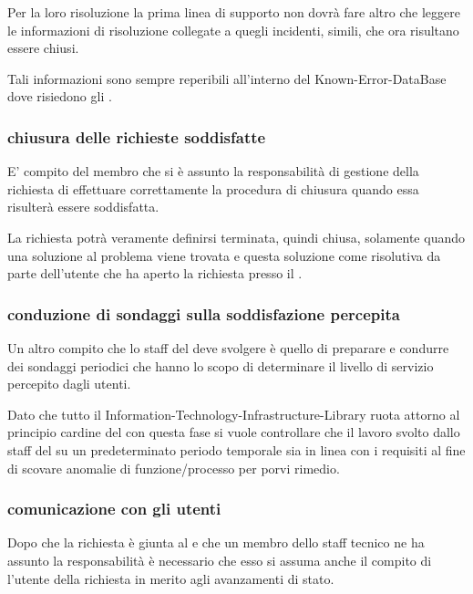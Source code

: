 Per la loro risoluzione la prima linea di supporto non dovrà fare altro che leggere le informazioni di risoluzione collegate a quegli incidenti, simili, che ora risultano essere chiusi.

Tali informazioni sono sempre reperibili all'interno del \ac{Known-Error-DataBase} dove risiedono gli .

\subsubsection[Chiusura delle richieste soddisfatte]{chiusura delle richieste soddisfatte}
E' compito del membro che si è assunto la responsabilità di gestione della richiesta di effettuare correttamente la procedura di chiusura quando essa risulterà essere soddisfatta.

La richiesta potrà veramente definirsi terminata, quindi chiusa, solamente quando una soluzione al problema viene trovata e questa soluzione  come risolutiva da parte dell'utente che ha aperto la richiesta presso il .

\subsubsection[Conduzione di sondaggi sulla soddisfazione percepita]{conduzione di sondaggi sulla soddisfazione percepita}
Un altro compito che lo staff del  deve svolgere è quello di preparare e condurre dei sondaggi periodici che hanno lo scopo di determinare il livello di servizio percepito dagli utenti.

Dato che tutto il  \ac{Information-Technology-Infrastructure-Library} ruota attorno al principio cardine del  con questa fase si vuole controllare che il lavoro svolto dallo staff del  su un predeterminato periodo temporale sia in linea con i requisiti al fine di scovare anomalie di funzione/processo per porvi rimedio.

\subsubsection[Comunicazione con gli utenti]{comunicazione con gli utenti}
Dopo che la richiesta è giunta al  e che un membro dello staff tecnico ne ha assunto la responsabilità è necessario che esso si assuma anche il compito di  l'utente della richiesta in merito agli avanzamenti di stato.


